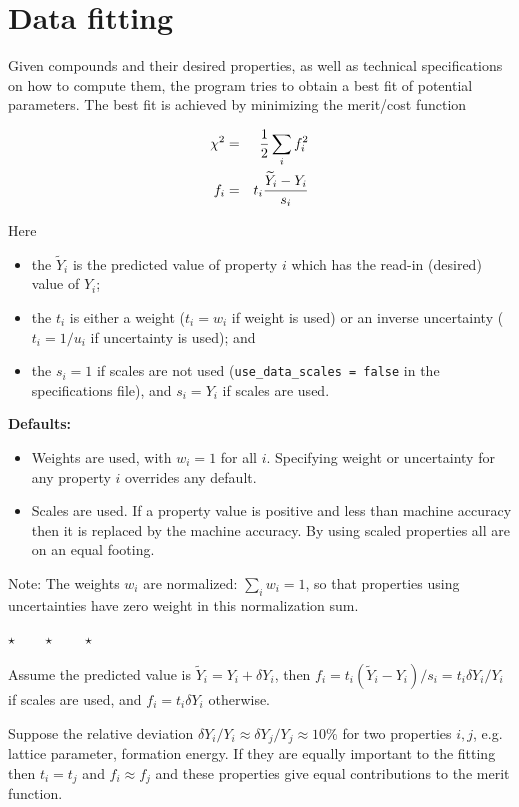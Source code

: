 \documentclass[a4paper,12pt,pdftex,onecolumn]{article}
\newcommand{\stars}{\begin{center}%
\vspace{1em plus 0.5em minus 0.5em}%
$\star \qquad \star \qquad \star$%
\vspace{1em plus 0.5em minus 0.5em}%
\end{center}}
\begin{document}
\section{Data fitting}

Given compounds and their desired properties, as well as technical specifications
on how to compute them, the program tries to obtain a best fit of potential
parameters. The best fit is achieved by minimizing the merit/cost function

\begin{eqnarray}
\chi^2 &=& {1 \over 2} \sum_i f_i^2 \\
f_i &=& t_i {\widetilde{Y}_i - Y_i \over s_i}
\end{eqnarray}

Here

\begin{itemize}
\item the $\widetilde{Y}_i$ is the predicted value of property $i$
which has the read-in (desired) value of $Y_i$;
\item the $t_i$ is either a weight ($t_i=w_i$ if weight is used)
or an inverse uncertainty ($t_i=1/u_i$ if uncertainty is used); and
\item the $s_i = 1$ if scales are not used (\verb+use_data_scales = false+ in the
specifications file), and $s_i = Y_i$ if scales are used.
\end{itemize}

\textbf{Defaults:}
\begin{itemize}
\item
Weights are used, with $w_i=1$ for all $i$. Specifying weight or uncertainty for
any property $i$ overrides any default.
\item 
Scales are used. If a property value is positive and less than machine accuracy
then it is replaced by the machine accuracy.
By using scaled properties all are on an equal footing.
\end{itemize}

Note: The weights $w_i$ are normalized: $\sum_i w_i = 1$,
so that properties using uncertainties have zero weight in this normalization sum.

\stars

Assume the predicted value is $\widetilde{Y}_i = Y_i + \delta Y_i$, then
$f_i = t_i (\widetilde{Y}_i - Y_i)/s_i = t_i \delta Y_i / Y_i$ if scales are used, and
$f_i = t_i \delta Y_i$ otherwise.

Suppose the relative deviation $\delta Y_i/Y_i \approx \delta Y_j/Y_j \approx 10\%$
for two properties $i,j$,
e.g. lattice parameter, formation energy.
If they are equally important to the fitting then $t_i=t_j$ and $f_i \approx f_j$
and these properties give equal contributions to the
merit function.
\end{document}
